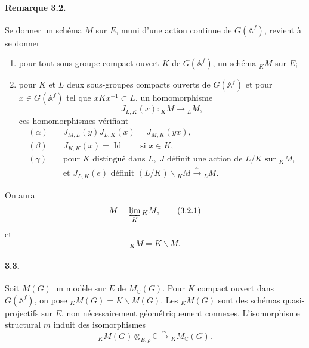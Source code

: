 \documentclass[10pt]{article}
\newcommand{\Af}{\mathbb A^f}
\newcommand{\C}{\mathbb C}
\newcommand{\id}{\operatorname{Id}}
\newcommand{\limproj}{\varprojlim}
\newcommand{\MC}{M_{\C}}
\begin{document}
\paragraph{Remarque 3.2.} Se donner un schéma $M$ sur $E$, muni d'une action continue de $G(\Af)$, revient à se donner
\begin{enumerate}[label=(\alph*),leftmargin=2.4em]
\item pour tout sous-groupe compact ouvert $K$ de $G(\Af)$, un schéma ${}_K M$ sur $E$;
\item pour $K$ et $L$ deux sous-groupes compacts ouverts de $G(\Af)$ et pour $x\in G(\Af)$ tel que $xKx^{-1}\subset L$, un homomorphisme
\[
J_{L,K}(x):{}_K M\longrightarrow {}_L M,
\]
ces homomorphismes vérifiant
\begin{align*}
(\alpha)\quad&J_{M,L}(y)J_{L,K}(x)=J_{M,K}(yx),\tag{3.2$\alpha$}\\
(\beta)\quad&J_{K,K}(x)=\id\qquad\text{si }x\in K,\tag{3.2$\beta$}\\
(\gamma)\quad&\text{pour }K\text{ distingué dans }L,\; J\text{ définit une action de }L/K\text{ sur }{}_K M,\\
&\text{et }J_{L,K}(e)\text{ définit }(L/K)\backslash {}_K M\xrightarrow{\sim}{}_L M.\tag{3.2$\gamma$}
\end{align*}
\end{enumerate}
On aura
\[
M=\limproj_K {}_K M,\tag{3.2.1}
\]
et
\[
{}_K M=K\backslash M.\tag{3.2.2}
\]

\paragraph{3.3.} Soit $M(G)$ un modèle sur $E$ de $\MC(G)$. Pour $K$ compact ouvert dans $G(\Af)$, on pose ${}_K M(G)=K\backslash M(G)$. Les ${}_K M(G)$ sont des schémas quasi-projectifs sur $E$, non nécessairement géométriquement connexes. L'isomorphisme structural $m$ induit des isomorphismes
\[
{}_K M(G)\otimes_{E,\rho}\C\xrightarrow{\sim}{}_K\MC(G).\tag{3.3.1}
\]
\end{document}
